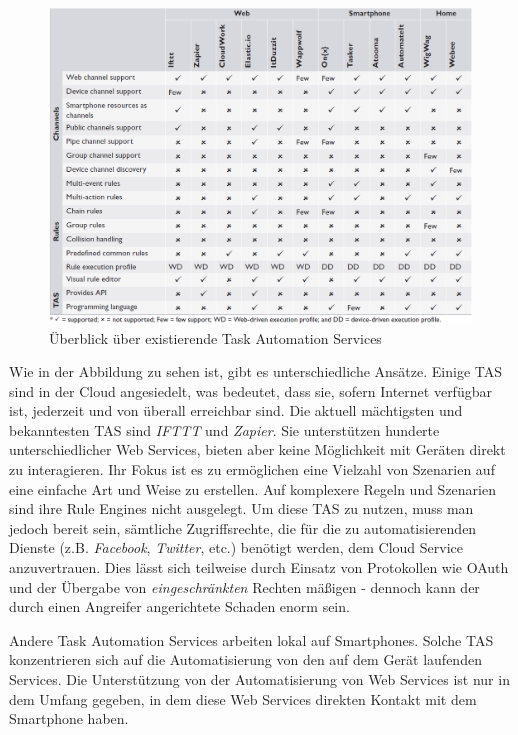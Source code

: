 \begin{figure}[h]
	\centering
	\includegraphics[width=\textwidth]{bilder/TASOverview}
	\caption{Überblick über existierende Task Automation Services \cite{ieee:tas}}
	\label{fig:tasoverview}
\end{figure}

Wie in der Abbildung zu sehen ist, gibt es unterschiedliche Ansätze. Einige TAS sind in der Cloud angesiedelt, was bedeutet, dass sie, sofern Internet verfügbar ist, jederzeit und von überall erreichbar sind. Die aktuell mächtigsten und bekanntesten TAS sind \textit{IFTTT} \cite{IFTTT} und \textit{Zapier}\cite{Zapier}. Sie unterstützen hunderte unterschiedlicher Web Services, bieten aber keine Möglichkeit mit Geräten direkt zu interagieren. Ihr Fokus ist es zu ermöglichen eine Vielzahl von Szenarien auf eine einfache Art und Weise zu erstellen. Auf komplexere Regeln und Szenarien sind ihre Rule Engines nicht ausgelegt. 
Um diese TAS zu nutzen, muss man jedoch bereit sein, sämtliche Zugriffsrechte, die für die zu automatisierenden Dienste (z.B. \textit{Facebook}, \textit{Twitter}, etc.) benötigt werden, dem Cloud Service anzuvertrauen. Dies lässt sich teilweise durch Einsatz von Protokollen wie OAuth und der Übergabe von \textit{eingeschränkten} Rechten mäßigen - dennoch kann der durch einen Angreifer angerichtete Schaden enorm sein.

Andere Task Automation Services arbeiten lokal auf Smartphones. Solche TAS konzentrieren sich auf die Automatisierung von den auf dem Gerät laufenden Services. Die Unterstützung von der Automatisierung von Web Services ist nur in dem Umfang gegeben, in dem diese Web Services direkten Kontakt mit dem Smartphone haben.  

